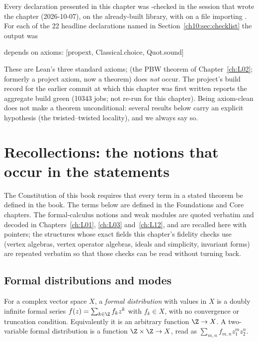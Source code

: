 \begin{status}
Every declaration presented in this chapter was -checked in the session that
wrote the chapter (2026-10-07), on the already-built library, with
 on a file importing .
For each of the 22 headline declarations named in Section~\ref{ch10:sec:checklist} the output was
\begin{plaincode}
depends on axioms: [propext, Classical.choice, Quot.sound]
\end{plaincode}
These are Lean's three standard axioms;  (the PBW theorem of Chapter~\ref{ch:L02}; formerly a project axiom, now a theorem) does \emph{not}
occur.  The project's build record for the earlier commit at which this chapter was first written
reports the aggregate build green (10343 jobs; not re-run for this chapter).  Being axiom-clean does not make a theorem unconditional: several results
below carry an explicit hypothesis (the twisted--twisted locality), and we always say so.
\end{status}

\section{Recollections: the notions that occur in the statements}\label{ch10:sec:recall}

The Constitution of this book requires that every term in a stated theorem be defined in the
book.  The terms below are defined in the Foundations and Core chapters.  The formal-calculus notions
and weak modules are quoted verbatim and decoded in Chapters~\ref{ch:L01}, \ref{ch:L03}
and~\ref{ch:L12}, and are recalled here with pointers; the structures whose exact fields this
chapter's fidelity checks use (vertex algebras, vertex operator algebras, ideals and simplicity,
invariant forms) are repeated verbatim so that those checks can be read without turning back.

\subsection{Formal distributions and modes}

\begin{definition}\label{ch10:def:formaldist}
For a complex vector space $X$, a \emph{formal distribution} with values in $X$ is a doubly
infinite formal series $f(z)=\sum_{k\in\Z}f_k z^k$ with $f_k\in X$, with no convergence or
truncation condition.  Equivalently it is an arbitrary function $\Z\to X$.  A two-variable
formal distribution is a function $\Z\times\Z\to X$, read as $\sum_{m,n}f_{m,n}z_1^m z_2^n$.
\end{definition}

